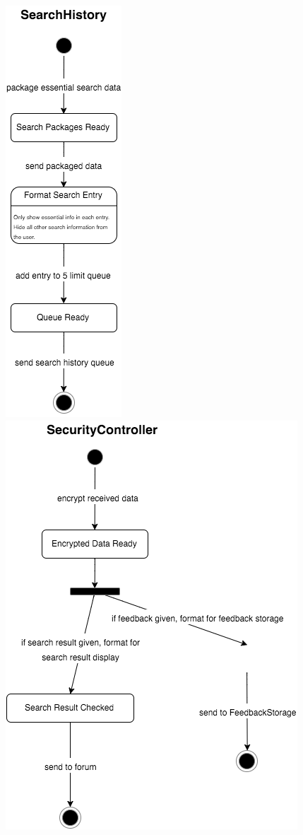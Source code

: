 \documentclass[12pt]{article}
\begin{document}
\includegraphics[scale=0.5]{searchHistory-sd.png}\\
\includegraphics[scale=0.5]{securityController-sd.png}\\
\end{document}
